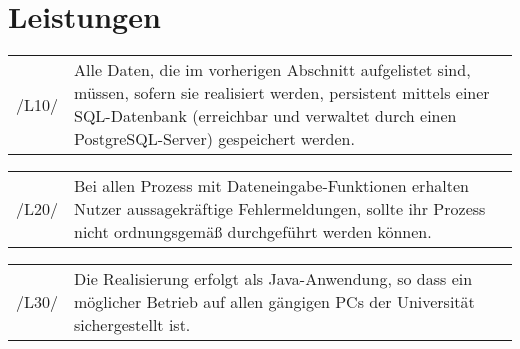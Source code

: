 \section{Leistungen}


\begin{tabular}{p{1.5cm}p{14.5cm}}


	 /L10/	& Alle Daten, die im vorherigen Abschnitt aufgelistet sind, müssen, sofern sie realisiert werden, persistent mittels einer SQL-Datenbank (erreichbar und verwaltet durch einen PostgreSQL-Server) gespeichert werden. \\[0.25cm]
	 
\end{tabular}


\begin{tabular}{p{1.5cm}p{14.5cm}}
						
	 /L20/	& Bei allen Prozess mit Dateneingabe-Funktionen erhalten Nutzer aussagekräftige Fehlermeldungen, sollte ihr Prozess nicht ordnungsgemäß durchgeführt werden können. \\[0.25cm]
	 
\end{tabular}


\begin{tabular}{p{1.5cm}p{14.5cm}}
						
	 /L30/	& Die Realisierung erfolgt als Java-Anwendung, so dass ein möglicher Betrieb auf allen gängigen PCs der Universität sichergestellt ist. \\[0.25cm]

\end{tabular}


